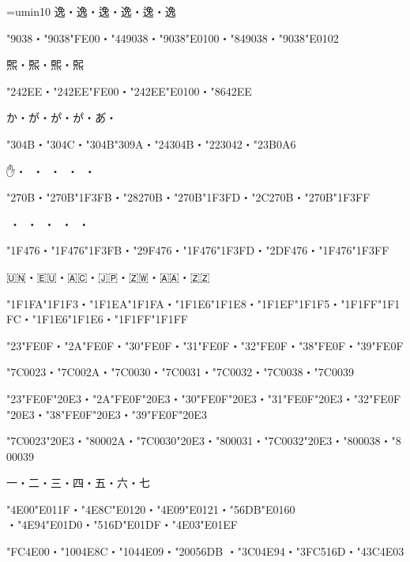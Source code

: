 
\parindent=0pt
\font\jpy=umin10
\jpy
逸・逸︀・逸︁・逸󠄀・逸󠄁・逸󠄂\par
\kchar"9038・\kchar"9038\kchar"FE00・\kchar"449038・\kchar"9038\kchar"E0100・\kchar"849038・\kchar"9038\kchar"E0102\par

𤋮・𤋮︀・𤋮󠄀・𤋮󠄁\par
\kchar"242EE・\kchar"242EE\kchar"FE00・\kchar"242EE\kchar"E0100・\kchar"8642EE\par

か・が・か゚・か゚・あ゙・𛂦゙\par
\kchar"304B・\kchar"304C・\kchar"304B\kchar"309A・\kchar"24304B・\kchar"223042・\kchar"23B0A6\par

✋・✋🏻・✋🏼・✋🏽・✋🏾・✋🏿\par
\kchar"270B・\kchar"270B\kchar"1F3FB・\kchar"28270B・\kchar"270B\kchar"1F3FD・\kchar"2C270B・\kchar"270B\kchar"1F3FF\par

👶・👶🏻・👶🏼・👶🏽・👶🏾・👶🏿\par
\kchar"1F476・\kchar"1F476\kchar"1F3FB・\kchar"29F476・\kchar"1F476\kchar"1F3FD・\kchar"2DF476・\kchar"1F476\kchar"1F3FF\par

🇺🇳・🇪🇺・🇦🇨・🇯🇵・🇿🇼・🇦🇦・🇿🇿\par
\kchar"1F1FA\kchar"1F1F3・\kchar"1F1EA\kchar"1F1FA・\kchar"1F1E6\kchar"1F1E8・\kchar"1F1EF\kchar"1F1F5・\kchar"1F1FF\kchar"1F1FC・\kchar"1F1E6\kchar"1F1E6・\kchar"1F1FF\kchar"1F1FF\par

\kchar"23\kchar"FE0F・\kchar"2A\kchar"FE0F・\kchar"30\kchar"FE0F・\kchar"31\kchar"FE0F・\kchar"32\kchar"FE0F・\kchar"38\kchar"FE0F・\kchar"39\kchar"FE0F\par
\kchar"7C0023・\kchar"7C002A・\kchar"7C0030・\kchar"7C0031・\kchar"7C0032・\kchar"7C0038・\kchar"7C0039\par

\kchar"23\kchar"FE0F\kchar"20E3・\kchar"2A\kchar"FE0F\kchar"20E3・\kchar"30\kchar"FE0F\kchar"20E3・\kchar"31\kchar"FE0F\kchar"20E3・\kchar"32\kchar"FE0F\kchar"20E3・\kchar"38\kchar"FE0F\kchar"20E3・\kchar"39\kchar"FE0F\kchar"20E3\par
\kchar"7C0023\kchar"20E3・\kchar"80002A・\kchar"7C0030\kchar"20E3・\kchar"800031・\kchar"7C0032\kchar"20E3・\kchar"800038・\kchar"800039\par

一󠄟・二󠄠・三󠄡・四󠅠・五󠇐・六󠇟・七󠇯\par
\kchar"4E00\kchar"E011F・\kchar"4E8C\kchar"E0120・\kchar"4E09\kchar"E0121・\kchar"56DB\kchar"E0160
・\kchar"4E94\kchar"E01D0・\kchar"516D\kchar"E01DF・\kchar"4E03\kchar"E01EF\par
\kchar"FC4E00・\kchar"1004E8C・\kchar"1044E09・\kchar"20056DB
・\kchar"3C04E94・\kchar"3FC516D・\kchar"43C4E03\par
\bye
